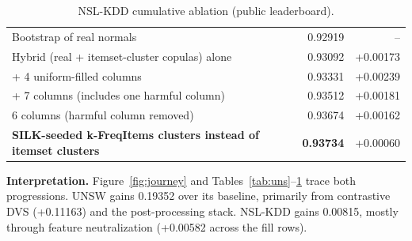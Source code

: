 \documentclass[10pt,a4paper]{article}
\newcommand{\best}[1]{\textbf{#1}}
\begin{document}
\begin{table}[H]
\begin{tabular}{p{9.5cm}rr}
Bootstrap of real normals & 0.92919 & --\\
Hybrid (real + itemset-cluster copulas) alone & 0.93092 & +0.00173\\
+ 4 uniform-filled columns & 0.93331 & +0.00239\\
+ 7 columns (includes one harmful column) & 0.93512 & +0.00181\\
6 columns (harmful column removed) & 0.93674 & +0.00162\\
\best{SILK-seeded k-FreqItems clusters instead of itemset clusters} & \best{0.93734} & +0.00060\\\bottomrule
\end{tabular}
\caption{NSL-KDD cumulative ablation (public leaderboard).}\label{tab:nsl}\end{table}
\textbf{Interpretation.} Figure~\ref{fig:journey} and Tables~\ref{tab:uns}--\ref{tab:nsl} trace both progressions. UNSW gains 0.19352 over its baseline, primarily from contrastive DVS (+0.11163) and the post-processing stack. NSL-KDD gains 0.00815, mostly through feature neutralization (+0.00582 across the fill rows).

\Needspace{0.45\textheight}
\end{document}
